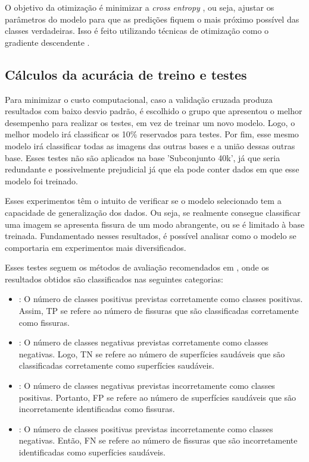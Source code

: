 O objetivo da otimização é minimizar a \textit{cross entropy} , ou seja, ajustar os parâmetros do modelo para que as predições fiquem o mais próximo possível das classes verdadeiras. 
Isso é feito utilizando técnicas de otimização como o gradiente descendente \cite{Goodfellow2016}.

\subsection{Cálculos da acurácia de treino e testes}
\label{sub:calcTreinTest}

Para minimizar o custo computacional, caso a validação cruzada produza resultados com baixo desvio padrão, é escolhido o grupo que apresentou o melhor desempenho para realizar os testes, em vez de treinar um novo modelo.
Logo, o melhor modelo irá classificar os 10\% reservados para testes.
Por fim, esse mesmo modelo irá classificar todas as imagens das outras bases e a união dessas outras base.
Esses testes não são aplicados na base 'Subconjunto 40k', já que seria redundante e possivelmente prejudicial já que ela pode conter dados em que esse modelo foi treinado.

Esses experimentos têm  o intuito de verificar se o modelo selecionado tem a capacidade de generalização dos dados.
Ou seja, se realmente consegue classificar uma imagem se apresenta fissura de um modo abrangente, ou se é limitado à base treinada.
Fundamentado nesses resultados, é possível analisar como o modelo se comportaria em experimentos mais diversificados.

Esses testes seguem os métodos de avaliação recomendados em , onde os resultados obtidos são classificados nas seguintes categorias:

\begin{itemize}
\item {}: O número de classes positivas previstas corretamente como classes positivas. 
Assim, TP se refere ao número de fissuras que são classificadas corretamente como fissuras.

\item {}: O número de classes negativas previstas corretamente como classes negativas. 
Logo, TN se refere ao número de superfícies saudáveis que são classificadas corretamente como superfícies saudáveis.

\item {}: O número de classes negativas previstas incorretamente como classes positivas. 
Portanto, FP se refere ao número de superfícies saudáveis que são incorretamente identificadas como fissuras.

\item {}: O número de classes positivas previstas incorretamente como classes negativas. 
Então, FN se refere ao número de fissuras que são incorretamente identificadas como superfícies saudáveis.
\end{itemize}

